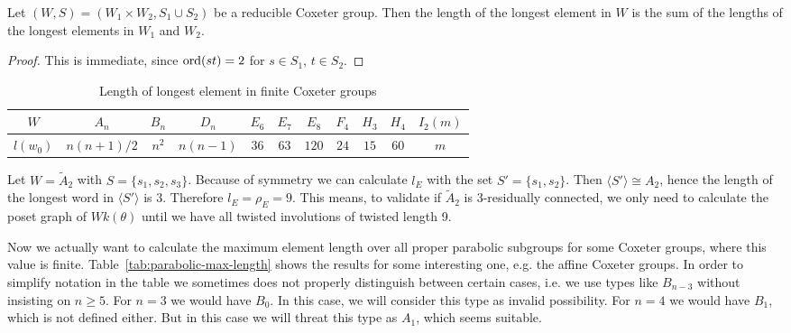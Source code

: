 \begin{prop}
	Let $(W,S) = (W_1 \times W_2, S_1 \cup S_2)$ be a reducible Coxeter group. Then the length of the longest element in $W$ is the sum of the lengths of the longest elements in $W_1$ and $W_2$.

	\begin{proof}
		This is immediate, since $\operatorname{ord}(st) = 2$ for $s \in S_1$, $t \in S_2$.
	\end{proof}
\end{prop}

\begin{table}[ht]
	\centering
	\begin{tabular}{|c|cccccccccc|}
		\hline
		$W$ & $A_n$ & $B_n$ & $D_n$ & $E_6$ & $E_7$ & $E_8$ & $F_4$ & $H_3$ & $H_4$ & $I_2(m)$ \\
		\hline
		$l(w_0)$ & $n(n+1)/2$ & $n^2$ & $n(n-1)$ & $36$ & $63$ & $120$ & $24$ & $15$ & $60$ & $m$ \\
		\hline
	\end{tabular}
	\caption{Length of longest element in finite Coxeter groups}
	\label{tab:length-w0}	
\end{table}

\begin{exam}
	Let $W = \tilde A_2$ with $S = \{s_1, s_2, s_3\}$. Because of symmetry we can calculate $l_E$ with the set $S' = \{s_1,s_2\}$. Then $\langle S' \rangle \cong A_2$, hence the length of the longest word in $\langle S' \rangle$ is $3$. Therefore $l_E = \rho_E = 9$. This means, to validate if $\tilde A_2$ is 3-residually connected, we only need to calculate the poset graph of $Wk(\theta)$ until we have all twisted involutions of twisted length 9.
\end{exam}

Now we actually want to calculate the maximum element length over all proper parabolic subgroups for some Coxeter groups, where this value is finite. Table~\ref{tab:parabolic-max-length} shows the results for some interesting one, e.g. the affine Coxeter groups. In order to simplify notation in the table we sometimes does not properly distinguish between certain cases, i.e. we use types like $B_{n-3}$ without insisting on $n \geq 5$. For $n=3$ we would have $B_0$. In this case, we will consider this type as invalid possibility. For $n=4$ we would have $B_1$, which is not defined either. But in this case we will threat this type as $A_1$, which seems suitable.

